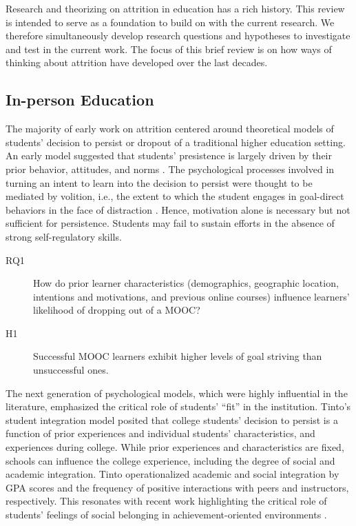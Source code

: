 \documentclass{sigchi}\usepackage[]{graphicx}\usepackage[]{color}
\begin{document}
Research and theorizing on attrition in education has a rich history. This review is intended to serve as a foundation to build on with the current research. We therefore simultaneously develop research questions and hypotheses to investigate and test in the current work. The focus of this brief review is on how ways of thinking about attrition have developed over the last decades. 

\subsection{In-person Education}

The majority of early work on attrition centered around theoretical models of students' decision to persist or dropout of a traditional higher education setting. An early model suggested that students' presistence is largely driven by their prior behavior, attitudes, and norms \cite{fishbein1975belief}. The psychological processes involved in turning an intent to learn into the decision to persist were thought to be mediated by volition, i.e., the extent to which the student engages in goal-direct behaviors in the face of distraction \cite{corno1993role}. Hence, motivation alone is necessary but not sufficient for persistence. Students may fail to sustain efforts in the absence of strong self-regulatory skills.

\begin{description}
  \item[RQ1] How do prior learner characteristics (demographics, geographic location, intentions and motivations, and previous online courses) influence learners' likelihood of dropping out of a MOOC?
  \item[H1] Successful MOOC learners exhibit higher levels of goal striving than unsuccessful ones.
\end{description}

The next generation of psychological models, which were highly influential in the literature, emphasized the critical role of students' ``fit'' in the institution. Tinto's \citeyear{tinto1975dropout} student integration model posited that college students' decision to persist is a function of prior experiences and individual students' characteristics, and experiences during college. While prior experiences and characteristics are fixed, schools can influence the college experience, including the degree of social and academic integration. Tinto operationalized academic and social integration by GPA scores and the frequency of positive interactions with peers and instructors, respectively. This resonates with recent work highlighting the critical role of students' feelings of social belonging in achievement-oriented environments \cite{walton2007question}. 
\end{document}
